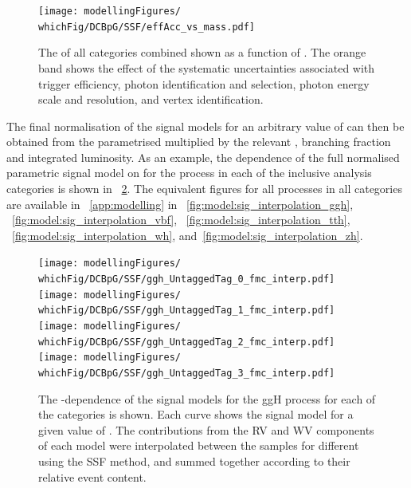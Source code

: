 \begin{figure}[ht!]
\centering
\texttt{[image: modellingFigures/\\whichFig/DCBpG/SSF/effAcc\_vs\_mass.pdf]} 
\caption{The \effxacc of all categories combined shown as a function of \mH. The orange band shows the effect of the systematic uncertainties associated with trigger efficiency, photon identification and selection, photon energy scale and resolution, and vertex identification.}

\label{fig:model:sig_effxacc}
\end{figure}

The final normalisation of the signal models for an arbitrary value of \mH can then be obtained from the parametrised \effxacc multiplied by the relevant \crosssection, branching fraction and integrated luminosity.
As an example, the dependence of the full normalised parametric signal model on \mH for the \ggH process in each of the inclusive analysis categories is shown in \Fig~\ref{fig:model:sig_interpolation}. The equivalent figures for all processes in all categories are available in \App~\ref{app:modelling} in \Fig\s~\ref{fig:model:sig_interpolation_ggh}, ~\ref{fig:model:sig_interpolation_vbf}, ~\ref{fig:model:sig_interpolation_tth}, ~\ref{fig:model:sig_interpolation_wh}, and~\ref{fig:model:sig_interpolation_zh}.

\begin{figure}[htp!]
\centering
\texttt{[image: modellingFigures/\\whichFig/DCBpG/SSF/ggh\_UntaggedTag\_0\_fmc\_interp.pdf]} 
\texttt{[image: modellingFigures/\\whichFig/DCBpG/SSF/ggh\_UntaggedTag\_1\_fmc\_interp.pdf]} \\ 
\texttt{[image: modellingFigures/\\whichFig/DCBpG/SSF/ggh\_UntaggedTag\_2\_fmc\_interp.pdf]} 
\texttt{[image: modellingFigures/\\whichFig/DCBpG/SSF/ggh\_UntaggedTag\_3\_fmc\_interp.pdf]} \\
\caption{The \mH-dependence of the signal models for the ggH process for each of the \Untagged categories is shown. Each curve shows the signal model for a given value of \mH. The contributions from the RV and WV components of each model were interpolated between the samples for different \mH using the SSF method, and summed together according to their relative event content.}

\label{fig:model:sig_interpolation}
\end{figure}

